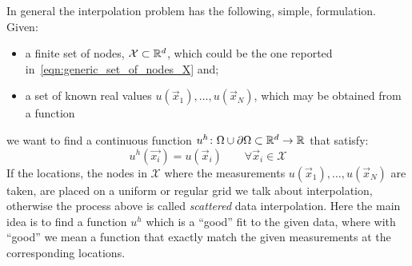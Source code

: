 In general the interpolation problem has the following, simple, formulation. Given:
\begin{itemize}
	\item a finite set of nodes,  $\mathcal{X} \subset \mathbb{R}^d$, which could be the one reported in~\eqref{eqn:generic_set_of_nodes_X} and;
	\item a set of known real values $u(\vec{x}_1), \dots, u(\vec{x}_N)$, which may be obtained from a function
\end{itemize}
we want to find a continuous function $u^{h} \colon \Omega\cup\partial\Omega\subset\mathbb{R}^{d} \to \mathbb{R}$ that satisfy:
\begin{equation}
	\label{eqn:interpolation_constraints}
	u^{h}(\vec{x_i}) = u(\vec{x}_i) \qquad  \forall \vec{x}_i \in \mathcal{X}
\end{equation}
If the locations, the nodes in $\mathcal{X}$ where the measurements $u(\vec{x}_1), \dots, u(\vec{x}_N)$ are taken, are placed on a uniform or regular grid we talk about interpolation, otherwise the process above is called \emph{scattered} data interpolation. Here the main idea is to find a function $u^h$ which is a ``good''  fit to the given data, where with ``good'' we mean a function that exactly match the given measurements at the corresponding locations.


